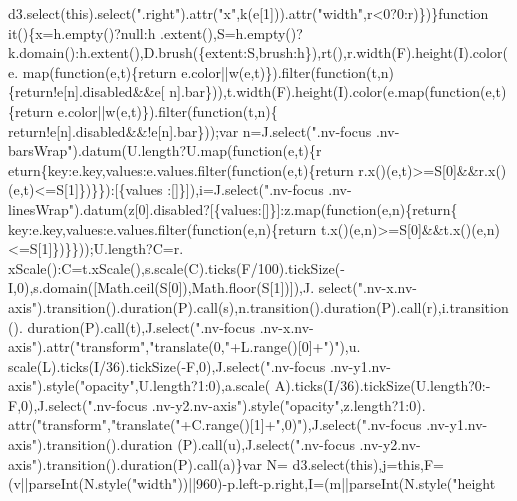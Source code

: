 \begin{DoxyCode}
{      d3.select(\textcolor{keyword}{this}).select(\textcolor{stringliteral}{".right"}).attr(\textcolor{stringliteral}{"x"},k(e[1])).attr(\textcolor{stringliteral}{"width"},r<0?0:r)\})\}\textcolor{keyword}{function} it()\{x=h.empty()?null:h
      .extent(),S=h.empty()?k.domain():h.extent(),D.brush(\{extent:S,brush:h\}),rt(),r.width(F).height(I).color(e.
      map(\textcolor{keyword}{function}(e,t)\{return e.color||w(e,t)\}).filter(\textcolor{keyword}{function}(t,n)\{\textcolor{keywordflow}{return}!e[n].disabled&&e[
      n].bar\})),t.width(F).height(I).color(e.map(\textcolor{keyword}{function}(e,t)\{return e.color||w(e,t)\}).filter(\textcolor{keyword}{function}(t,n)\{\textcolor{keywordflow}{
      return}!e[n].disabled&&!e[n].bar\}));var n=J.select(\textcolor{stringliteral}{".nv-focus .nv-barsWrap"}).datum(U.length?U.map(\textcolor{keyword}{function}(e,t)\{r
      eturn\{key:e.key,values:e.values.filter(function(e,t)\{return r.x()(e,t)>=S[0]&&r.x()(e,t)<=S[1]\})\}\}):[\{values
      :[]\}]),i=J.select(\textcolor{stringliteral}{".nv-focus .nv-linesWrap"}).datum(z[0].disabled?[\{values:[]\}]:z.map(\textcolor{keyword}{function}(e,n)\{\textcolor{keywordflow}{return}\{
      key:e.key,values:e.values.filter(\textcolor{keyword}{function}(e,n)\{\textcolor{keywordflow}{return} t.x()(e,n)>=S[0]&&t.x()(e,n)<=S[1]\})\}\}));U.length?C=r.
      xScale():C=t.xScale(),s.scale(C).ticks(F/100).tickSize(-I,0),s.domain([Math.ceil(S[0]),Math.floor(S[1])]),J.
      select(\textcolor{stringliteral}{".nv-x.nv-axis"}).transition().duration(P).call(s),n.transition().duration(P).call(r),i.transition().
      duration(P).call(t),J.select(\textcolor{stringliteral}{".nv-focus .nv-x.nv-axis"}).attr(\textcolor{stringliteral}{"transform"},\textcolor{stringliteral}{"translate(0,"}+L.range()[0]+\textcolor{stringliteral}{")"}),u.
      scale(L).ticks(I/36).tickSize(-F,0),J.select(\textcolor{stringliteral}{".nv-focus .nv-y1.nv-axis"}).style(\textcolor{stringliteral}{"opacity"},U.length?1:0),a.scale(
      A).ticks(I/36).tickSize(U.length?0:-F,0),J.select(\textcolor{stringliteral}{".nv-focus .nv-y2.nv-axis"}).style(\textcolor{stringliteral}{"opacity"},z.length?1:0).
      attr(\textcolor{stringliteral}{"transform"},\textcolor{stringliteral}{"translate("}+C.range()[1]+\textcolor{stringliteral}{",0)"}),J.select(\textcolor{stringliteral}{".nv-focus .nv-y1.nv-axis"}).transition().duration
      (P).call(u),J.select(\textcolor{stringliteral}{".nv-focus .nv-y2.nv-axis"}).transition().duration(P).call(a)\}var N=
      d3.select(\textcolor{keyword}{this}),j=\textcolor{keyword}{this},F=(v||parseInt(N.style(\textcolor{stringliteral}{"width"}))||960)-p.left-p.right,I=(m||parseInt(N.style(\textcolor{stringliteral}{"height
}}
\end{DoxyCode}
